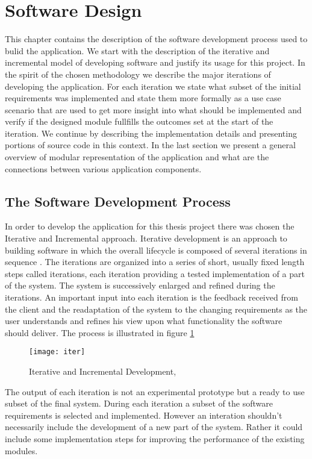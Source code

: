\section{Software Design}

This chapter contains the description of the software development process
used to bulid the application. We start with the description of the
iterative and incremental model of developing software and justify its usage
for this project. In the spirit of the chosen methodology we describe the
major iterations of developing the application. For each iteration we state
what subset of the initial requirements was implemented and state them more
formally as a use case scenario that are used to get more insight into what
should be implemented and verify if the designed module fullfills the
outcomes set at the start of the iteration. We continue by describing the
implementation details and presenting portions of source code in this
context. In the last section we present a general overview of modular
representation of the application and what are the connections between
various application components.

\subsection{The Software Development Process}

In order to develop the application for this thesis project there was chosen the
Iterative and Incremental approach. Iterative development is an approach to
building software in which the overall lifecycle is composed of several
iterations in sequence \cite{Larman1}. 
The iterations are organized into a series of short, usually fixed length
steps called iterations, each iteration providing a tested implementation of
a part of the system. The system is successively enlarged and refined during
the iterations. An important input into each iteration is the feedback
received from the client and the readaptation of the system to the changing
requirements as the user understands and refines his view upon what
functionality the software should deliver. The process is illustrated in
figure \ref{IterativeAndIncremental}

\begin{figure}[!ht]
\centering
\texttt{[image: iter]}
\caption{Iterative and Incremental Development, \cite{Larman2}}\label{IterativeAndIncremental}
\end{figure}

The output of each iteration is not an experimental prototype but a ready to
use subset of the final system. During each iteration a subset of the
software requirements is selected and implemented. However an interation
shouldn't necessarily include the development of a new part of the system.
Rather it could include some implementation steps for improving the
performance of the existing modules.

